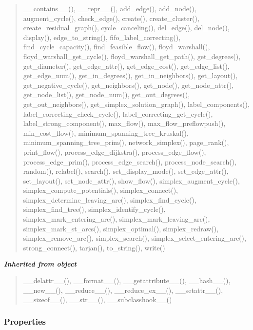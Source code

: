 \begin{quote}
\_\_contains\_\_(), \_\_repr\_\_(), add\_edge(), add\_node(), augment\_cycle(), check\_edge(), create(), create\_cluster(), create\_residual\_graph(), cycle\_canceling(), del\_edge(), del\_node(), display(), edge\_to\_string(), fifo\_label\_correcting(), find\_cycle\_capacity(), find\_feasible\_flow(), floyd\_warshall(), floyd\_warshall\_get\_cycle(), floyd\_warshall\_get\_path(), get\_degrees(), get\_diameter(), get\_edge\_attr(), get\_edge\_cost(), get\_edge\_list(), get\_edge\_num(), get\_in\_degrees(), get\_in\_neighbors(), get\_layout(), get\_negative\_cycle(), get\_neighbors(), get\_node(), get\_node\_attr(), get\_node\_list(), get\_node\_num(), get\_out\_degrees(), get\_out\_neighbors(), get\_simplex\_solution\_graph(), label\_components(), label\_correcting\_check\_cycle(), label\_correcting\_get\_cycle(), label\_strong\_component(), max\_flow(), max\_flow\_preflowpush(), min\_cost\_flow(), minimum\_spanning\_tree\_kruskal(), minimum\_spanning\_tree\_prim(), network\_simplex(), page\_rank(), print\_flow(), process\_edge\_dijkstra(), process\_edge\_flow(), process\_edge\_prim(), process\_edge\_search(), process\_node\_search(), random(), relabel(), search(), set\_display\_mode(), set\_edge\_attr(), set\_layout(), set\_node\_attr(), show\_flow(), simplex\_augment\_cycle(), simplex\_compute\_potentials(), simplex\_connect(), simplex\_determine\_leaving\_arc(), simplex\_find\_cycle(), simplex\_find\_tree(), simplex\_identify\_cycle(), simplex\_mark\_entering\_arc(), simplex\_mark\_leaving\_arc(), simplex\_mark\_st\_arcs(), simplex\_optimal(), simplex\_redraw(), simplex\_remove\_arc(), simplex\_search(), simplex\_select\_entering\_arc(), strong\_connect(), tarjan(), to\_string(), write()
\end{quote}

\large{\textbf{\textit{Inherited from object}}}

\begin{quote}
\_\_delattr\_\_(), \_\_format\_\_(), \_\_getattribute\_\_(), \_\_hash\_\_(), \_\_new\_\_(), \_\_reduce\_\_(), \_\_reduce\_ex\_\_(), \_\_setattr\_\_(), \_\_sizeof\_\_(), \_\_str\_\_(), \_\_subclasshook\_\_()
\end{quote}


  \subsubsection{Properties}

